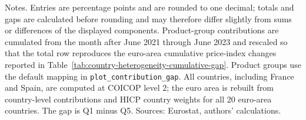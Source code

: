 \begin{table}[H]
\small
\setlength{\tabcolsep}{4.2pt}
\renewcommand{\arraystretch}{0.95}

\caption{\label{tab:ea20-income-gap-product-contributions}Product-group contributions to euro-area cumulative income inflation gaps, June 2021--June 2023}
\centering
{}
\vspace{-0.4em}
\begin{flushleft}
\footnotesize{Notes. Entries are percentage points and are rounded to one decimal; totals and gaps are calculated before rounding and may therefore differ slightly from sums or differences of the displayed components. Product-group contributions are cumulated from the month after June 2021 through June 2023 and rescaled so that the total row reproduces the euro-area cumulative price-index changes reported in Table~\ref{tab:country-heterogeneity-cumulative-gap}. Product groups use the default mapping in \texttt{plot\_contribution\_gap}. All countries, including France and Spain, are computed at COICOP level 2; the euro area is rebuilt from country-level contributions and HICP country weights for all 20 euro-area countries. The gap is Q1 minus Q5. Sources: Eurostat, authors' calculations.}
\end{flushleft}
\end{table}
